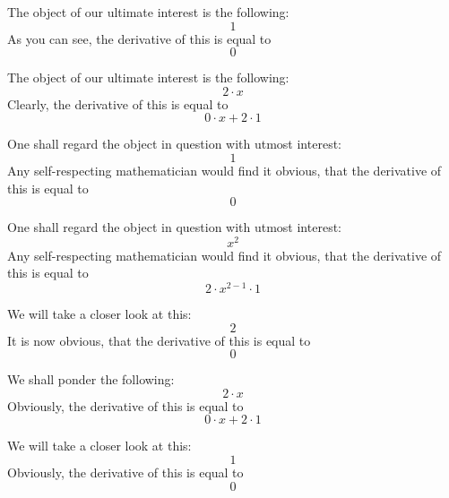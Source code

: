 \documentclass{article}
\begin{document}
The object of our ultimate interest is the following:
\begin{equation}
1 
\end{equation}
As you can see, the derivative of this is equal to
\begin{equation}
0 
\end{equation}

The object of our ultimate interest is the following:
\begin{equation}
2 \cdot x 
\end{equation}
Clearly, the derivative of this is equal to
\begin{equation}
0 \cdot x + 2 \cdot 1 
\end{equation}

One shall regard the object in question with utmost interest:
\begin{equation}
1 
\end{equation}
Any self-respecting mathematician would find it obvious, that the derivative of this is equal to
\begin{equation}
0 
\end{equation}

One shall regard the object in question with utmost interest:
\begin{equation}
x ^{2 } 
\end{equation}
Any self-respecting mathematician would find it obvious, that the derivative of this is equal to
\begin{equation}
2 \cdot x ^{2 - 1 } \cdot 1 
\end{equation}

We will take a closer look at this:
\begin{equation}
2 
\end{equation}
It is now obvious, that the derivative of this is equal to
\begin{equation}
0 
\end{equation}

We shall ponder the following:
\begin{equation}
2 \cdot x 
\end{equation}
Obviously, the derivative of this is equal to
\begin{equation}
0 \cdot x + 2 \cdot 1 
\end{equation}

We will take a closer look at this:
\begin{equation}
1 
\end{equation}
Obviously, the derivative of this is equal to
\begin{equation}
0 
\end{equation}
\end{document}
